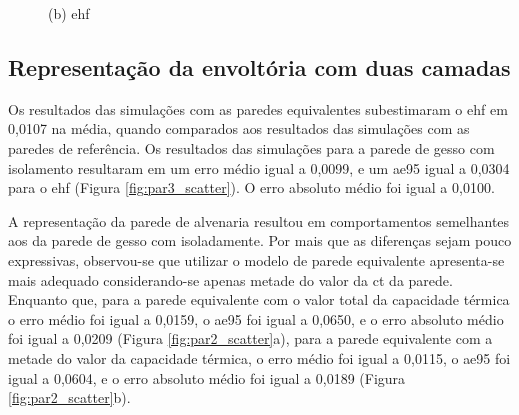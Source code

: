 \documentclass[brazil,hardcopy,openany]{ufscthesis} %
\newcommand{\figsize}{.6}
\begin{document}
\begin{figure}[h]
\begin{minipage}{.5\textwidth}
		\begin{center}
			\small{(b) \acrlong{ehf}}
		\end{center}
	\end{minipage}
	\label{fig:cpaverage_tempEHF_scatter}
\end{figure}

%

\subsection*{Representação da envoltória com duas camadas}

Os resultados das simulações com as paredes equivalentes subestimaram o \acrshort{ehf} em 0,0107 na média, quando comparados aos resultados das simulações com as paredes de referência. 
Os resultados das simulações para a parede de gesso com isolamento resultaram em um erro médio igual a 0,0099, e um \acrshort{ae95} igual a 0,0304 para o \acrshort{ehf} (Figura \ref{fig:par3_scatter}). O erro absoluto médio foi igual a 0,0100.

A representação da parede de alvenaria resultou em comportamentos semelhantes aos da parede de gesso com isoladamente.
Por mais que as diferenças sejam pouco expressivas, observou-se que utilizar o modelo de parede equivalente apresenta-se mais adequado considerando-se apenas metade do valor da \acrfull{ct} da parede. Enquanto que, para a parede equivalente com o valor total da capacidade térmica o erro médio foi igual a 0,0159, o \acrshort{ae95} foi igual a 0,0650, e o erro absoluto médio foi igual a 0,0209 (Figura \ref{fig:par2_scatter}a), para a parede equivalente com a metade do valor da capacidade térmica, o erro médio foi igual a 0,0115, o \acrshort{ae95} foi igual a 0,0604, e o erro absoluto médio foi igual a 0,0189 (Figura \ref{fig:par2_scatter}b).
\end{document}
